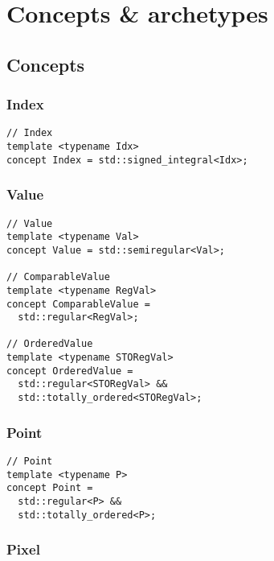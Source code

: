 \chapter{Concepts \& archetypes}
\label{appendix.concepts.and.archetypes}

\section{Concepts}

\subsection{Index}

\begin{verbatim}
// Index
template <typename Idx>
concept Index = std::signed_integral<Idx>;
\end{verbatim}


\subsection{Value}

\begin{verbatim}
// Value
template <typename Val>
concept Value = std::semiregular<Val>;

// ComparableValue
template <typename RegVal>
concept ComparableValue =
  std::regular<RegVal>;

// OrderedValue
template <typename STORegVal>
concept OrderedValue =
  std::regular<STORegVal> &&
  std::totally_ordered<STORegVal>;
\end{verbatim}


\subsection{Point}

\begin{verbatim}
// Point
template <typename P>
concept Point =
  std::regular<P> &&
  std::totally_ordered<P>;
\end{verbatim}


\subsection{Pixel}

